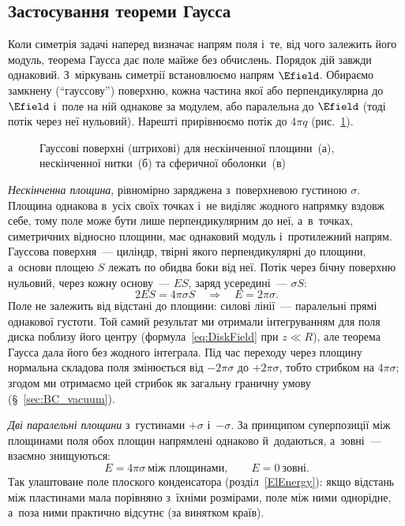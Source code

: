 \subsection*{Застосування теореми Гаусса}

Коли симетрія задачі наперед визначає напрям поля і~те, від чого залежить його модуль,
теорема Гаусса дає поле майже без обчислень. Порядок дій завжди однаковий. З~міркувань
симетрії встановлюємо напрям $\Efield$. Обираємо замкнену (\enquote{гауссову}) поверхню,
кожна частина якої або перпендикулярна до $\Efield$ і~поле на ній однакове за модулем, або
паралельна до $\Efield$ (тоді потік через неї нульовий). Нарешті прирівнюємо потік до
$4\pi q$ (рис.~\ref{tikz:GaussApplications}).

\begin{figure}[h!]
	\centering
	\caption{Гауссові поверхні (штрихові) для нескінченної площини~(а), нескінченної
		нитки~(б) та сферичної оболонки~(в)}
	\label{tikz:GaussApplications}
\end{figure}

\emph{Нескінченна площина}, рівномірно заряджена з~поверхневою густиною $\sigma$. Площина
однакова в~усіх своїх точках і~не виділяє жодного напрямку вздовж себе, тому поле може
бути лише перпендикулярним до неї, а~в~точках, симетричних відносно площини, має однаковий
модуль і~протилежний напрям. Гауссова поверхня~--- циліндр, твірні якого перпендикулярні
до площини, а~основи площею $S$ лежать по обидва боки від неї. Потік через бічну поверхню
нульовий, через кожну основу~--- $ES$, заряд усередині~--- $\sigma S$:
\begin{equation}\label{eq:PlaneField}
	2ES = 4\pi\sigma S \quad\Rightarrow\quad E = 2\pi\sigma.
\end{equation}
Поле не залежить від відстані до площини: силові лінії~--- паралельні прямі однакової
густоти. Той самий результат ми отримали інтегруванням для поля диска поблизу його центру
(формула~\eqref{eq:DiskField} при $z\ll R$), але теорема Гаусса дала його без жодного
інтеграла. Під час переходу через площину нормальна складова поля змінюється від
$-2\pi\sigma$ до $+2\pi\sigma$, тобто стрибком на $4\pi\sigma$; згодом ми отримаємо цей
стрибок як загальну граничну умову (\S~\ref{sec:BC_vacuum}).

\emph{Дві паралельні площини} з~густинами $+\sigma$ і~$-\sigma$. За принципом суперпозиції
між площинами поля обох площин напрямлені однаково й~додаються, а~зовні~--- взаємно
знищуються:
\begin{equation}\label{eq:TwoPlanesField}
	E = 4\pi\sigma \ \text{між площинами},\qquad E = 0 \ \text{зовні}.
\end{equation}
Так улаштоване поле плоского конденсатора (розділ~\ref{ElEnergy}): якщо відстань між
пластинами мала порівняно з~їхніми розмірами, поле між ними однорідне, а~поза ними
практично відсутнє (за винятком країв).


